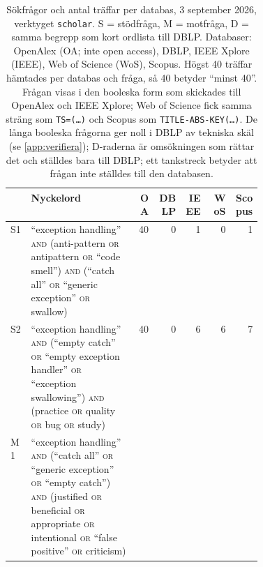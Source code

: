 \begin{table}[htbp]
  \centering
  \caption{Sökfrågor och antal träffar per databas, 3
    september 2026, verktyget \texttt{scholar}.  S = stödfråga,
    M = motfråga, D = samma begrepp som kort ordlista till DBLP.
    Databaser: OpenAlex (OA; inte \foreignlanguage{english}{open
    access}), DBLP, IEEE Xplore (IEEE), Web of Science (WoS), Scopus.
    Högst 40 träffar hämtades per databas och fråga, så 40 betyder
    \enquote{minst 40}.  Frågan visas i den booleska form som skickades
    till OpenAlex och IEEE Xplore; Web of Science fick samma sträng som
    \texttt{TS=(\dots)} och Scopus som
    \texttt{TITLE-ABS-KEY(\dots)}.  De långa booleska frågorna ger noll
    i DBLP av tekniska skäl (se \cref{app:verifiera}); D-raderna är
    omsökningen som rättar det och ställdes bara till DBLP; ett
    tankstreck betyder att frågan inte ställdes till den
    databasen.}
  \label{tab:ca-queries}
  \footnotesize
  \begin{tabular}{@{}lp{0.42\linewidth}rrrrr@{}}
    \toprule
    & Nyckelord & OA & DBLP & IEEE & WoS & Scopus \\
    \midrule
    S1 & \enquote{exception handling} \textsc{and} (anti-pattern
      \textsc{or} antipattern \textsc{or} \enquote{code smell})
      \textsc{and} (\enquote{catch all} \textsc{or} \enquote{generic
      exception} \textsc{or} swallow)
      & 40 & 0 & 1 & 0 & 1 \\
    S2 & \enquote{exception handling} \textsc{and} (\enquote{empty
      catch} \textsc{or} \enquote{empty exception handler} \textsc{or}
      \enquote{exception swallowing}) \textsc{and} (practice
      \textsc{or} quality \textsc{or} bug \textsc{or} study)
      & 40 & 0 & 6 & 6 & 7 \\
    M1 & \enquote{exception handling} \textsc{and} (\enquote{catch
      all} \textsc{or} \enquote{generic exception} \textsc{or}
      \enquote{empty catch}) \textsc{and} (justified \textsc{or}
      beneficial \textsc{or} appropriate \textsc{or} intentional
      \textsc{or} \enquote{false positive} \textsc{or} criticism)

\end{tabular}
\end{table}
